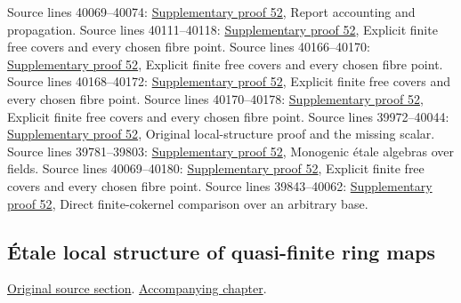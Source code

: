 \begin{AlgebraSourceRoutes}
 Source lines 40069--40074: \hyperlink{algebra_etale_local_notes_20260928}{Supplementary proof 52}, Report accounting and propagation.
 Source lines 40111--40118: \hyperlink{algebra_etale_local_notes_20260928}{Supplementary proof 52}, Explicit finite free covers and every chosen fibre point.
 Source lines 40166--40170: \hyperlink{algebra_etale_local_notes_20260928}{Supplementary proof 52}, Explicit finite free covers and every chosen fibre point.
 Source lines 40168--40172: \hyperlink{algebra_etale_local_notes_20260928}{Supplementary proof 52}, Explicit finite free covers and every chosen fibre point.
 Source lines 40170--40178: \hyperlink{algebra_etale_local_notes_20260928}{Supplementary proof 52}, Explicit finite free covers and every chosen fibre point.
 Source lines 39972--40044: \hyperlink{algebra_etale_local_notes_20260928}{Supplementary proof 52}, Original local-structure proof and the missing scalar.
 Source lines 39781--39803: \hyperlink{algebra_etale_local_notes_20260928}{Supplementary proof 52}, Monogenic étale algebras over fields.
 Source lines 40069--40180: \hyperlink{algebra_etale_local_notes_20260928}{Supplementary proof 52}, Explicit finite free covers and every chosen fibre point.
 Source lines 39843--40062: \hyperlink{algebra_etale_local_notes_20260928}{Supplementary proof 52}, Direct finite-cokernel comparison over an arbitrary base.
\end{AlgebraSourceRoutes}

\subsection{\'Etale local structure of quasi-finite ring maps}
\hypertarget{algebra-source-section-etale-local-quasi-finite}{}
\noindent\href{https://github.com/stacks/stacks-project/blob/a04446e57ec1fbc252a871afcec7752fb2807b14/algebra.tex\#L40188}{Original source section}. \href{algebra.pdf\#nameddest=section-etale-local-quasi-finite}{Accompanying chapter}.

